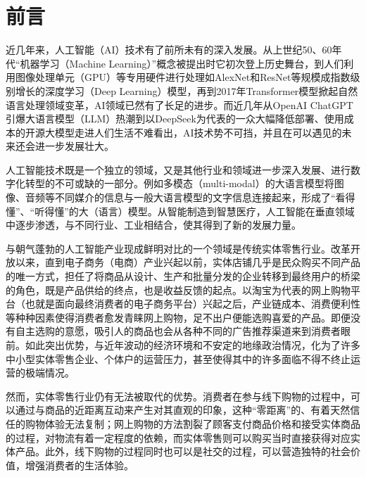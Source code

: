 \section{前\hspace{1em}言}

近几年来，人工智能（AI）技术有了前所未有的深入发展。从上世纪50、60年代“机器学习（Machine Learning）”\cite{samuel1959machine_learning}概念被提出时它初次登上历史舞台，到人们利用图像处理单元（GPU）等专用硬件进行处理\cite{raina2009deep_unsupervised_learning}如AlexNet\cite{krizhevsky2017alexnet}和ResNet\cite{he2016resnet}等规模成指数级别增长的深度学习（Deep Learning）模型，再到2017年Transformer模型\cite{vaswani2023attention_is_all_you_need}掀起自然语言处理领域变革，AI领域已然有了长足的进步。而近几年从OpenAI ChatGPT\cite{openai2022chatgpt}引爆大语言模型（LLM）热潮到以DeepSeek为代表的一众大幅降低部署、使用成本的开源大模型走进人们生活不难看出，AI技术势不可挡，并且在可以遇见的未来还会进一步发展壮大。

人工智能技术既是一个独立的领域，又是其他行业和领域进一步深入发展\cite{su2025ai_plus_concrete_economics}、进行数字化转型\cite{xie2025ai_plus_digitization}的不可或缺的一部分。例如多模态（multi-modal）的大语言模型将图像、音频等不同媒介的信息与一般大语言模型的文字信息连接起来，形成了“看得懂”、“听得懂”的大（语言）模型\cite{radford2022multimodal_speech}。从智能制造到智慧医疗，人工智能在垂直领域中逐步渗透，与不同行业、工业相结合，使其得到了新的发展力量。

与朝气蓬勃的人工智能产业现成鲜明对比的一个领域是传统实体零售行业。改革开放以来，直到电子商务（电商）产业兴起以前，实体店铺几乎是民众购买不同产品的唯一方式，担任了将商品从设计、生产和批量分发的企业转移到最终用户的桥梁的角色，既是产品供给的终点，也是收益反馈的起点。以淘宝为代表的网上购物平台（也就是面向最终消费者的电子商务平台）兴起之后，产业链成本、消费便利性等种种因素使得消费者愈发青睐网上购物，足不出户便能选购喜爱的产品。即便没有自主选购的意愿，吸引人的商品也会从各种不同的广告推荐渠道来到消费者眼前。如此突出优势，与近年波动的经济环境和不安定的地缘政治情况，化为了许多中小型实体零售企业、个体户的运营压力，甚至使得其中的许多面临不得不终止运营的极端情况。

然而，实体零售行业仍有无法被取代的优势。消费者在参与线下购物的过程中，可以通过与商品的近距离互动来产生对其直观的印象，这种“零距离”的、有着天然信任的购物体验无法复制；网上购物的方法割裂了顾客支付商品价格和接受实体商品的过程，对物流有着一定程度的依赖，而实体零售则可以购买当时直接获得对应实体产品。此外，线下购物的过程同时也可以是社交的过程，可以营造独特的社会价值，增强消费者的生活体验。

